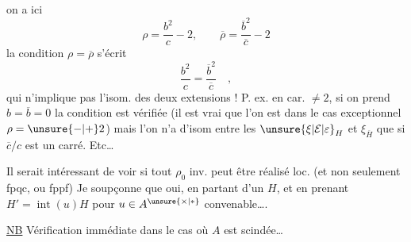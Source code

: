 on a ici
\[
\rho=\frac{b^2}{c}-2,\qquad\overline\rho=\frac{\overline b^2}{\overline c}-2
\]
la condition $\rho=\overline\rho$ s'écrit
\[
\frac{b^2}{c}=\frac{\overline b^2}{\overline c}\quad,
\]
qui n'implique pas l'isom. des deux extensions ! P. ex. en car. $\ne2$, si on prend $b=\overline b=0$ la condition est vérifiée  (il est vrai que l'on est dans le cas exceptionnel $\rho=\unsure{-|+}2$) mais l'on n'a d'isom entre les  $\unsure{\xi|\mathcal E|\varepsilon}_H$ et $\xi_{\overline H}$ que si $\overline c/c$ est un carré.  Etc\ldots

Il serait intéressant de voir si tout $\rho_0$ inv. peut être réalisé loc.  (et non seulement fpqc, ou fppf) Je soupçonne que oui, en partant d'un $H$, et en prenant $H'=\operatorname{int}(u)H$ pour $u\in A^{\unsure{\times|*}}$ convenable\ldots.

\uline{NB} Vérification immédiate dans le cas où $A$ est scindée\ldots

